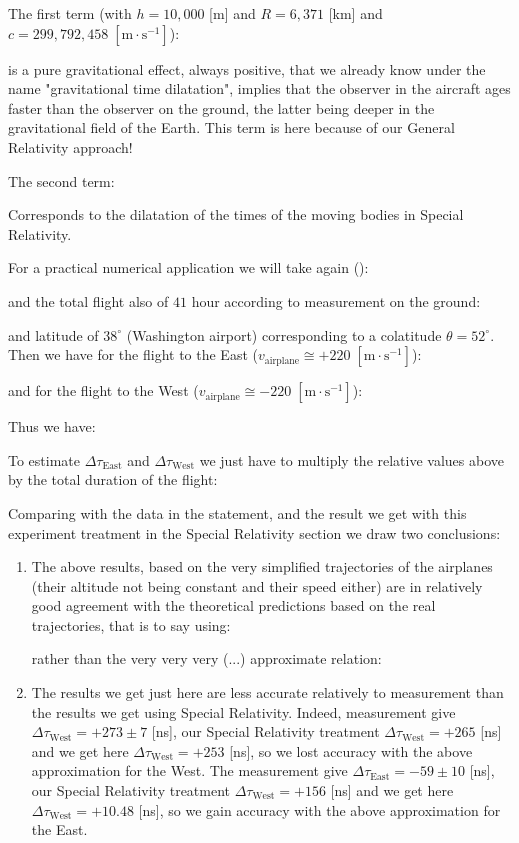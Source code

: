 	The first term (with $h=10,000$ [m] and $R=6,371$ [km] and $c=299,792,458\;[\text{m}\cdot\text{s}^{-1}]$):
	
	is a pure gravitational effect, always positive, that we already know under the name "gravitational time dilatation", implies that the observer in the aircraft ages faster than the observer on the ground, the latter being deeper in the gravitational field of the Earth. This term is here because of our General Relativity approach! 
	
	The second term:
	
	Corresponds to the dilatation of the times of the moving bodies in Special Relativity.
	
	For a practical numerical application we will take again ():
	
	and the total flight also of $41$ hour according to measurement on the ground:
	
	and latitude of $38^\circ$ (Washington airport) corresponding to a colatitude $\theta=52^\circ$. Then we have for the flight to the East ($v_\text{airplane}\cong +220\;[\text{m}\cdot\text{s}^{-1}]$):
	
	and for the flight to the West ($v_\text{airplane}\cong -220\;[\text{m}\cdot\text{s}^{-1}]$):
	
	Thus we have:
	
	To estimate $\Delta \tau_\text{East}$ and $\Delta\tau_\text{West}$ we just have to multiply the relative values above by the total duration of the flight:
	
	Comparing with the data in the statement, and the result we get with this experiment treatment in the Special Relativity section we draw two conclusions:
	\begin{enumerate}
		\item The above results, based on the very simplified trajectories of the airplanes (their altitude not being constant and their speed either) are in relatively good agreement with the theoretical predictions based on the real trajectories, that is to say using:
		
		rather than the very very very (...) approximate relation:
		
		
		\item The results we get just here are less accurate relatively to measurement than the results we get using Special Relativity. Indeed, measurement give $\Delta \tau_\text{West}=+273 \pm 7$ [ns], our Special Relativity treatment $\Delta \tau_\text{West}=+265$ [ns] and we get here $\Delta \tau_\text{West}=+253$ [ns], so we lost accuracy with the above approximation for the West. The measurement give $\Delta \tau_\text{East}=-59 \pm10$ [ns], our Special Relativity treatment $\Delta \tau_\text{West}=+156$ [ns] and we get here $\Delta \tau_\text{West}=+10.48$ [ns], so we gain accuracy with the above approximation for the East. 
		
	\end{enumerate}
	

